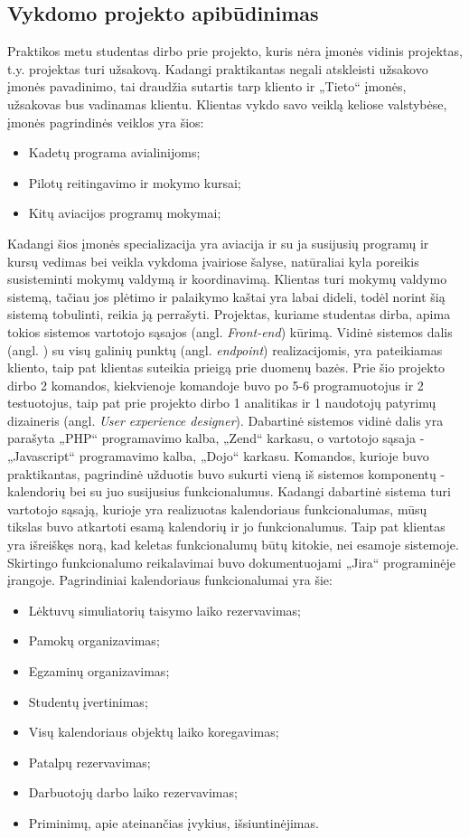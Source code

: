 \documentclass{VUMIFPSbakalaurinis}
\begin{document}
\subsection{Vykdomo projekto apibūdinimas}
Praktikos metu studentas dirbo prie projekto, kuris nėra įmonės vidinis projektas, t.y. projektas turi užsakovą. Kadangi praktikantas negali atskleisti užsakovo įmonės pavadinimo, tai draudžia sutartis tarp kliento ir „Tieto“ įmonės, užsakovas bus vadinamas klientu. Klientas vykdo savo veiklą keliose valstybėse, įmonės pagrindinės veiklos yra šios:
\begin{itemize}
    \item Kadetų programa avialinijoms;
    \item Pilotų reitingavimo ir mokymo kursai;
    \item Kitų aviacijos programų mokymai;
\end{itemize}
Kadangi šios įmonės specializacija yra aviacija ir su ja susijusių programų ir kursų vedimas bei veikla vykdoma įvairiose šalyse, natūraliai kyla poreikis susisteminti mokymų valdymą ir koordinavimą. Klientas turi mokymų valdymo sistemą, tačiau jos plėtimo ir palaikymo kaštai yra labai dideli, todėl norint šią sistemą tobulinti, reikia ją perrašyti. Projektas, kuriame studentas dirba, apima tokios sistemos vartotojo sąsajos (angl. \textit{Front-end}) kūrimą. Vidinė sistemos dalis (angl. ) su visų galinių punktų (angl. \textit{endpoint}) realizacijomis, yra pateikiamas kliento, taip pat klientas suteikia prieigą prie duomenų bazės. Prie šio projekto dirbo 2 komandos, kiekvienoje komandoje buvo po 5-6 programuotojus ir 2 testuotojus, taip pat prie projekto dirbo 1 analitikas ir 1 naudotojų patyrimų dizaineris (angl. \textit{User experience designer}). Dabartinė sistemos vidinė dalis yra parašyta „PHP“ programavimo kalba, „Zend“ karkasu, o vartotojo sąsaja - „Javascript“ programavimo kalba, „Dojo“ karkasu. Komandos, kurioje buvo praktikantas, pagrindinė užduotis buvo sukurti vieną iš sistemos komponentų - kalendorių bei su juo susijusius funkcionalumus. Kadangi dabartinė sistema turi vartotojo sąsają, kurioje yra realizuotas kalendoriaus funkcionalumas, mūsų tikslas buvo atkartoti esamą kalendorių ir jo funkcionalumus. Taip pat klientas yra išreiškęs norą, kad keletas funkcionalumų būtų kitokie, nei esamoje sistemoje. Skirtingo funkcionalumo reikalavimai buvo dokumentuojami „Jira“ programinėje įrangoje. Pagrindiniai kalendoriaus funkcionalumai yra šie:
\begin{itemize}
    \item Lėktuvų simuliatorių taisymo laiko rezervavimas;
    \item Pamokų organizavimas;
    \item Egzaminų organizavimas;
    \item Studentų įvertinimas;
    \item Visų kalendoriaus objektų laiko koregavimas;
    \item Patalpų rezervavimas;
    \item Darbuotojų darbo laiko rezervavimas;
    \item Priminimų, apie ateinančias įvykius, išsiuntinėjimas.
\end{itemize}
\end{document}
